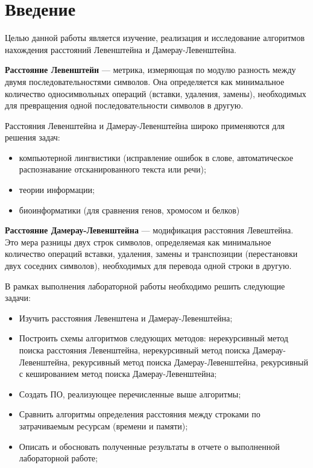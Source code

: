\chapter*{Введение}

Целью данной работы является изучение, реализация и исследование алгоритмов нахождения расстояний Левенштейна и Дамерау-Левенштейна.

\bigskip

\textbf{Расстояние Левенштейн} — метрика, измеряющая по модулю разность между двумя последовательностями символов. Она определяется как минимальное количество односимвольных операций (вставки, удаления, замены), необходимых для превращения одной последовательности символов в другую.

\bigskip

Расстояния Левенштейна и  Дамерау-Левенштейна широко применяются для решения задач:
\begin{itemize}
	\item компьютерной лингвистики (исправление ошибок в слове, автоматическое распознавание отсканированного текста или речи);
	\item теории информации;
	\item биоинформатики (для сравнения генов, хромосом и белков)
\end{itemize}

\textbf{Расстояние Дамерау-Левенштейна} — модификация расстояния Левештейна. Это мера разницы двух строк символов, определяемая как минимальное количество операций вставки, удаления, замены и транспозиции (перестановки двух соседних символов), необходимых для перевода одной строки в другую.

\bigskip

В рамках выполнения лабораторной работы необходимо решить следующие задачи:

\begin{itemize}
	\item Изучить расстояния Левенштена и Дамерау-Левенштейна;
	\item Построить схемы алгоритмов следующих методов: нерекурсивный метод поиска расстояния Левенштейна, нерекурсивный метод поиска Дамерау-Левенштейна, рекурсивный метод поиска Дамерау-Левенштейна, рекурсивный с кешированием метод поиска Дамерау-Левенштейна;
	\item Создать ПО, реализующее перечисленные выше алгоритмы;
	\item Сравнить алгоритмы определения расстояния между строками по затрачиваемым ресурсам (времени и памяти);
	\item Описать и обосновать полученные результаты в отчете о выполненной лабораторной работе;
\end{itemize}